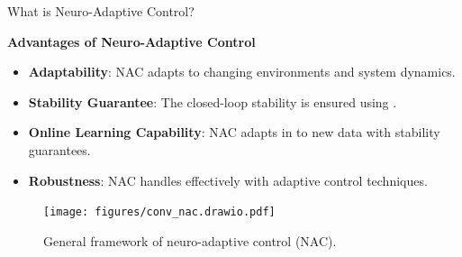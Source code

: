 \documentclass[8pt, aspectratio=169]{beamer}
\newcommand{\ctxt}[2]{\color{#1}{#2}\color{black}}
\begin{document}
\begin{frame}{\insertsubsectionhead}{What is Neuro-Adaptive Control?}

  \textbf{Advantages of Neuro-Adaptive Control}
  \small{
    \begin{itemize}
      \item <2-> \textbf{Adaptability}: NAC adapts \ctxt{airforceblue}{NN weights }to changing environments and system dynamics.
      \item <3-> \textbf{Stability Guarantee}: The closed-loop stability is ensured using \ctxt{airforceblue}{Lyapunov stability theory}.
      \item <4-> \textbf{Online Learning Capability}: NAC adapts in \ctxt{airforceblue}{real-time } to new data with stability guarantees.
      \item <5-> \textbf{Robustness}: NAC handles \ctxt{airforceblue}{uncertainties and disturbances }effectively with adaptive control techniques.
    \end{itemize}
  }
  
\begin{figure}
  \label{fig:general_framework}
  \texttt{[image: figures/conv\_nac.drawio.pdf]}
  \caption{General framework of neuro-adaptive control (NAC).}
\end{figure}

\end{frame}

\end{document}
